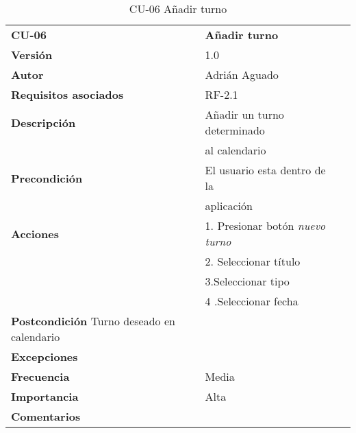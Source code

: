 \begin{table}
\begin{tabular}{llr}  
\toprule
\begin{minipage}[b]{0.24\columnwidth}\raggedright\strut
\textbf{CU-06}\strut
\end{minipage} & \begin{minipage}[b]{0.72\columnwidth}\raggedright\strut
\textbf{Añadir turno}\strut
\end{minipage}\tabularnewline
\cmidrule(r){1-2}
\textbf{Versión}       & 1.0           \\
\textbf{Autor}       & Adrián  Aguado    \\
\textbf{Requisitos asociados}       & RF-2.1  \\ 
\textbf{Descripción} &  Añadir un turno determinado \\
& al calendario      \\
\textbf{Precondición} & El usuario esta dentro de la \\
& aplicación       \\
\textbf{Acciones} & 1. Presionar  botón \emph{nuevo turno} \\
& 2. Seleccionar título \\
& 3.Seleccionar tipo \\
& 4 .Seleccionar fecha\\
\textbf{Postcondición} Turno deseado en calendario \\
\textbf{Excepciones} &     \\
\textbf{Frecuencia} & Media          \\
\textbf{Importancia} & Alta            \\
\textbf{Comentarios } &      \\
\bottomrule
\end{tabular}
\caption{CU-06 Añadir turno} 
\end{table}


